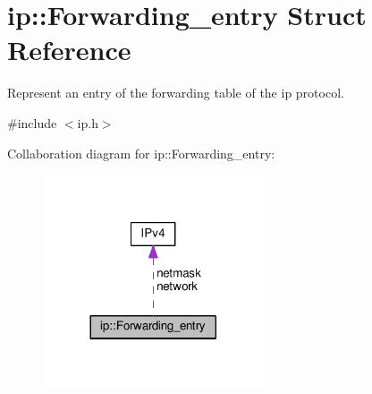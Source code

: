 \hypertarget{structip_1_1Forwarding__entry}{}\section{ip\+:\+:Forwarding\+\_\+entry Struct Reference}
\label{structip_1_1Forwarding__entry}


Represent an entry of the forwarding table of the ip protocol.  




{\ttfamily \#include $<$ip.\+h$>$}



Collaboration diagram for ip\+:\+:Forwarding\+\_\+entry\+:\nopagebreak
\begin{figure}[H]
\begin{center}
\leavevmode
\includegraphics[width=185pt]{structip_1_1Forwarding__entry__coll__graph}
\end{center}
\end{figure}
